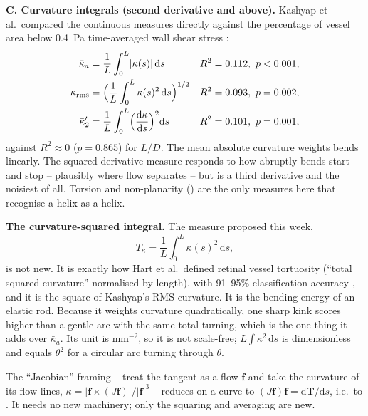 \textbf{C. Curvature integrals (second derivative and above).}
Kashyap et al.\ compared the continuous measures directly against the percentage of vessel area
below 0.4~Pa time-averaged wall shear stress \cite{kashyap2022tortuosity}:
\begin{align}
  \bar\kappa_{a} &= \frac{1}{L}\int_0^L \lvert\kappa(s)\rvert\,\mathrm ds
     && R^2 = 0.112,\ p < 0.001, \\
  \kappa_{\mathrm{rms}} &= \Bigl(\frac{1}{L}\int_0^L \kappa(s)^2\,\mathrm ds\Bigr)^{1/2}
     && R^2 = 0.093,\ p = 0.002, \\
  \bar\kappa'_{2} &= \frac{1}{L}\int_0^L \Bigl(\frac{\mathrm d\kappa}{\mathrm ds}\Bigr)^{2}\mathrm ds
     && R^2 = 0.101,\ p = 0.001,
\end{align}
against $R^2 \approx 0$ ($p = 0.865$) for $L/D$. The mean absolute curvature weights bends
linearly. The squared-derivative measure responds to how abruptly bends start and stop -- plausibly
where flow separates -- but is a third derivative and the noisiest of all. Torsion and
non-planarity () are the only measures here that recognise a helix as a
helix.

\textbf{The curvature-squared integral.} The measure proposed this week,
\begin{equation}
  T_\kappa = \frac{1}{L}\int_0^L \kappa(s)^2\,\mathrm ds,
  \label{eq:week3-tkappa}
\end{equation}
is not new. It is exactly how Hart et al.\ defined retinal vessel tortuosity (``total squared
curvature'' normalised by length), with 91--95\% classification accuracy
\cite{hart1999tortuosity}, and it is the square of Kashyap's RMS curvature. It is the bending
energy of an elastic rod. Because it weights curvature quadratically, one sharp kink scores higher
than a gentle arc with the same total turning, which is the one thing it adds over
$\bar\kappa_a$. Its unit is mm$^{-2}$, so it is not scale-free; $L\int\kappa^2\,\mathrm ds$ is
dimensionless and equals $\theta^2$ for a circular arc turning through $\theta$.

The ``Jacobian'' framing -- treat the tangent as a flow $\mathbf f$ and take the curvature of its
flow lines, $\kappa = \lvert \mathbf f \times (J\mathbf f) \rvert / \lvert \mathbf f\rvert^3$ --
reduces on a curve to $(J\mathbf f)\mathbf f = \mathrm d\mathbf T/\mathrm ds$, i.e.\ to
. It needs no new machinery; only the squaring and averaging are new.

